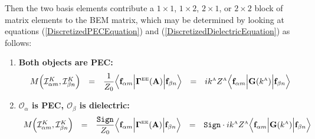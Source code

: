 \documentclass[dvips,letterpaper]{article}
\begin{document}
Then the two basis elements contribute a 
$1\times 1$, $1\times 2$, $2\times 1$, or $2\times 2$
block of matrix elements to the BEM matrix, which may be determined
by looking at equations 
(\ref{DiscretizedPECEquation}) 
and 
(\ref{DiscretizedDielectricEquation}) 
as follows:
\begin{enumerate}
\item \textbf{Both objects are PEC:}
$$\begin{array}{lclcl}
   M\Big( \mathcal{I}^K_{\alpha m}, \mathcal{I}^K_{\beta n} \Big) 
  &=&
  \displaystyle{ \frac{1}{Z_0} 
                 \Big\langle 
                 \vb f_{\alpha m} 
                 \Big| \BG\supt{EE}(\vb A) \Big|
                 \vb f_{\beta n} 
                 \Big\rangle
               }
  &=&
  \displaystyle{
  ik\supt{A} Z\supt{A}
                \Big\langle 
                \vb f_{\alpha m} 
                \Big| \vb G(k\supt{A}) \Big|
                \vb f_{\beta n} 
                \Big\rangle
               }
\end{array}$$
\item \textbf{ $\mathcal{O}_\alpha$ is PEC, 
               $\mathcal{O}_\beta$ is dielectric:}
$$\begin{array}{lclcl}
 M\Big( \mathcal{I}^K_{\alpha m}, \mathcal{I}^K_{\beta n} \Big) 
  &=& 
  \displaystyle{ \frac{\texttt{Sign}}{Z_0} 
                 \Big\langle \vb f_{\alpha m} 
                 \Big| \BG\supt{EE}(\vb A) \Big|
                 \vb f_{\beta n} 
                 \Big\rangle
               }
  &=&
  \displaystyle{ \texttt{Sign}\cdot ik\supt{A} Z\supt{A}
                 \Big\langle \vb f_{\alpha m} 
                 \Big| \vb G(k\supt{A}) \Big|
                 \vb f_{\beta n} 
                 \Big\rangle
               }
\\[10pt]

\end{array}$$
\end{enumerate}
\end{document}
